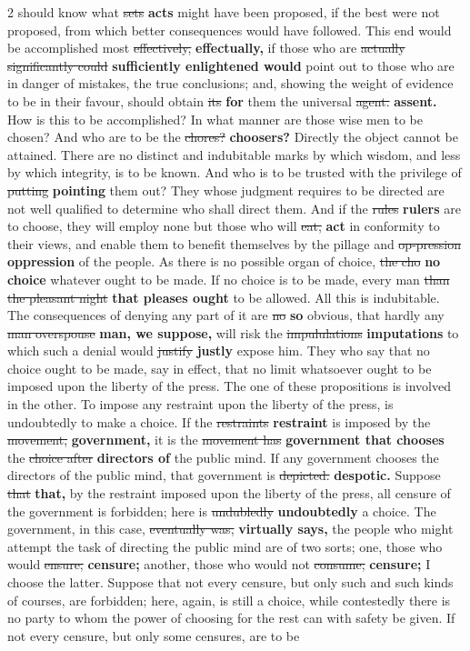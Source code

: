 \documentclass[10pt]{article}
\begin{document}
\begin{multicols}{2}
should know what \sout{sets} \textbf{acts} might have been proposed, if the best were not proposed, from which better consequences would have followed. This end would be accomplished most \sout{effectively,} \textbf{effectually,} if those who are \sout{actually significantly could} \textbf{sufficiently enlightened would} point out to those who are in danger of mistakes, the true conclusions; and, showing the weight of evidence to be in their favour, should obtain \sout{its} \textbf{for} them the universal \sout{agent.} \textbf{assent.} How is this to be accomplished? In what manner are those wise men to be chosen? And who are to be the \sout{chores?} \textbf{choosers?} Directly the object cannot be attained. There are no distinct and indubitable marks by which wisdom, and less by which integrity, is to be known. And who is to be trusted with the privilege of \sout{putting} \textbf{pointing} them out? They whose judgment requires to be directed are not well qualified to determine who shall direct them. And if the \sout{rules} \textbf{rulers} are to choose, they will employ none but those who will \sout{eat,} \textbf{act} in conformity to their views, and enable them to benefit themselves by the pillage and \sout{op-pression} \textbf{oppression} of the people. As there is no possible organ of choice, \sout{the cho} \textbf{no choice} whatever ought to be made. If no choice is to be made, every man \sout{than the pleasant night} \textbf{that pleases ought} to be allowed. All this is indubitable. The consequences of denying any part of it are \sout{no} \textbf{so} obvious, that hardly any \sout{man overspouse} \textbf{man, we suppose,} will risk the \sout{impululations} \textbf{imputations} to which such a denial would \sout{justify} \textbf{justly} expose him. They who say that no choice ought to be made, say in effect, that no limit whatsoever ought to be imposed upon the liberty of the press. The one of these propositions is involved in the other. To impose any restraint upon the liberty of the press, is undoubtedly to make a choice. If the \sout{restraints} \textbf{restraint} is imposed by the \sout{movement,} \textbf{government,} it is the \sout{movement has} \textbf{government that chooses} the \sout{choice after} \textbf{directors of} the public mind. If any government chooses the directors of the public mind, that government is \sout{depicted.} \textbf{despotic.} Suppose \sout{that} \textbf{that,} by the restraint imposed upon the liberty of the press, all censure of the government is forbidden; here is \sout{undubledly} \textbf{undoubtedly} a choice. The government, in this case, \sout{eventually was,} \textbf{virtually says,} the people who might attempt the task of directing the public mind are of two sorts; one, those who would \sout{ensure;} \textbf{censure;} another, those who would not \sout{consume;} \textbf{censure;} I choose the latter. Suppose that not every censure, but only such and such kinds of courses, are forbidden; here, again, is still a choice, while contestedly there is no party to whom the power of choosing for the rest can with safety be given. If not every censure, but only some censures, are to be
\end{multicols}
\end{document}
